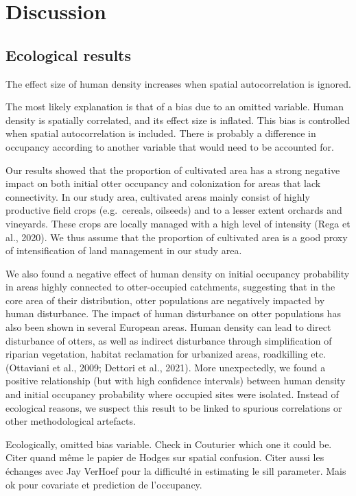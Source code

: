 \documentclass[
  11pt,
  a4paper,
]{article}
\begin{document}
\section{Discussion}\label{discussion}

\subsection{Ecological results}\label{ecological-results}

The effect size of human density increases when spatial autocorrelation is ignored.

The most likely explanation is that of a bias due to an omitted variable.
Human density is spatially correlated, and its effect size is inflated.
This bias is controlled when spatial autocorrelation is included.
There is probably a difference in occupancy according to another variable that would need to be accounted for.

Our results showed that the proportion of cultivated area has a strong negative impact on both initial otter occupancy and colonization for areas that lack connectivity. In our study area, cultivated areas mainly consist of highly productive field crops (e.g.~cereals, oilseeds) and to a lesser extent orchards and vineyards. These crops are locally managed with a high level of intensity (Rega et al., 2020). We thus assume that the proportion of cultivated area is a good proxy of intensification of land management in our study area.

We also found a negative effect of human density on initial occupancy probability in areas highly connected to otter-occupied catchments, suggesting that in the core area of their distribution, otter populations are negatively impacted by human disturbance. The impact of human disturbance on otter populations has also been shown in several European areas. Human density can lead to direct disturbance of otters, as well as indirect disturbance through simplification of riparian vegetation, habitat reclamation for urbanized areas, roadkilling etc. (Ottaviani et al., 2009; Dettori et al., 2021). More unexpectedly, we found a positive relationship (but with high confidence intervals) between human density and initial occupancy probability where occupied sites were isolated. Instead of ecological reasons, we suspect this result to be linked to spurious correlations or other methodological artefacts.

Ecologically, omitted bias variable. Check in Couturier which one it could be. Citer quand même le papier de Hodges sur spatial confusion. Citer aussi les échanges avec Jay VerHoef pour la difficulté in estimating le sill parameter. Mais ok pour covariate et prediction de l'occupancy.
\end{document}
